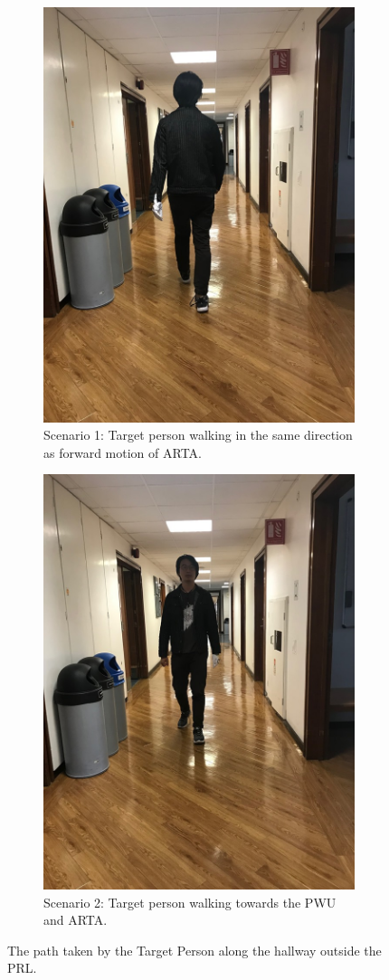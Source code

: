 \begin{figure}[ht]
	\begin{subfigure}[b]{.48\textwidth}
		\centering
		\includegraphics[width=0.5\linewidth]{img/chapter6_test/zihanBack.jpg}
		\caption{Scenario 1: Target person walking in the same direction as forward motion of ARTA.}
	\end{subfigure}%
	\hspace{\fill} 
	\begin{subfigure}[b]{.48\textwidth}
		\centering
		\includegraphics[width=0.5\linewidth]{img/chapter6_test/zihanForward.jpg}
		\caption{Scenario 2: Target person walking towards the PWU and ARTA.}
	\end{subfigure}
	\vspace{-1\baselineskip}
	\begin{center}
		\caption{The path taken by the Target Person along the hallway outside the PRL.}
		\label{fig:zihanBackForward}
	\end{center}
	\vspace{-2\baselineskip}
\end{figure}


